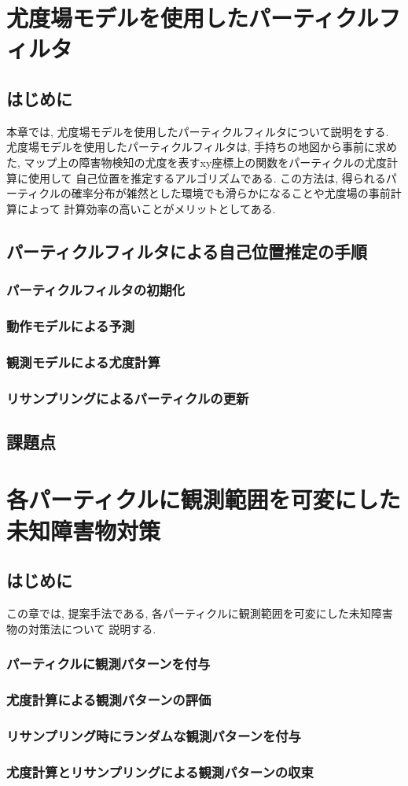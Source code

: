 \chapter{尤度場モデルを使用したパーティクルフィルタ}
\section{はじめに}
本章では, 尤度場モデルを使用したパーティクルフィルタについて説明をする. 
尤度場モデルを使用したパーティクルフィルタは, 手持ちの地図から事前に求めた, 
マップ上の障害物検知の尤度を表すxy座標上の関数をパーティクルの尤度計算に使用して
自己位置を推定するアルゴリズムである. 
この方法は, 得られるパーティクルの確率分布が雑然とした環境でも滑らかになることや尤度場の事前計算によって
計算効率の高いことがメリットとしてある. 

\section{パーティクルフィルタによる自己位置推定の手順}
\subsection{パーティクルフィルタの初期化}
\subsection{動作モデルによる予測}
\subsection{観測モデルによる尤度計算}
\subsection{リサンプリングによるパーティクルの更新}

\section{課題点}


\chapter{各パーティクルに観測範囲を可変にした未知障害物対策}
\section{はじめに}
この章では, 提案手法である, 各パーティクルに観測範囲を可変にした未知障害物の対策法について
説明する. 

\subsection{パーティクルに観測パターンを付与}
\subsection{尤度計算による観測パターンの評価}
\subsection{リサンプリング時にランダムな観測パターンを付与}
\subsection{尤度計算とリサンプリングによる観測パターンの収束}


